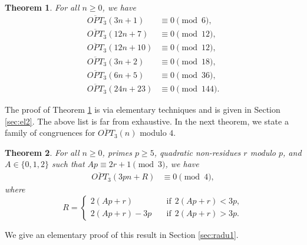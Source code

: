 \documentclass[12pt,reqno]{amsart}
\numberwithin{equation}{section}
\newcommand{\opt}{\overline{OPT}}
\newtheorem{theorem}{Theorem}[section]
\begin{document}
\begin{theorem}\label{thm:3}
    For all $n\geq 0$, we have
    \begin{align}
    \opt_3(3n+1)&\equiv 0 \pmod{6},\label{eq9}\\
    \opt_3(12n+7)&\equiv 0 \pmod{12},\label{eq10}\\
 \opt_3(12n+10)&\equiv 0 \pmod{12},\label{eq11}\\
    \opt_3(3n+2)&\equiv 0 \pmod{18},\label{eq12}\\
        \opt_3(6n+5)&\equiv 0\pmod{36} \label{eq15},\\
    \opt_3(24n+23)&\equiv 0\pmod{144}\label{24n+23}.
    \end{align}
\end{theorem}
\noindent The proof of Theorem \ref{thm:3} is via elementary techniques and is given in Section \ref{sec:el2}. The above list is far from exhaustive. In the next theorem, we state a family of congruences for $\opt_3(n)$ modulo $4$.
\begin{theorem}\label{singlemodcong}
For all $n\geq0$, primes $p\ge 5$, quadratic non-residues $r$ modulo $p$, and $A\in\{0,1,2\}$ such that $Ap\equiv 2r+1\pmod{3}$, we have
    \begin{align}
    \opt_3(3pn+R)&\equiv 0\pmod{4},\label{Family 1 mod 4}
\end{align}
where
\[R=\begin{cases}
    2(Ap+r) & \quad \text{if}~~ 2(Ap+r)<3p,\\
     2(Ap+r)-3p & \quad \text{if}~~ 2(Ap+r)>3p.
\end{cases}\]
\end{theorem}
\noindent We give an elementary proof of this result in Section \ref{sec:radu1}.
\end{document}
